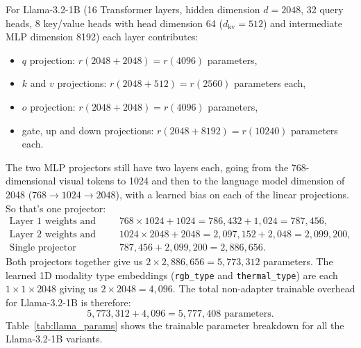\documentclass[12pt]{report}
\begin{document}
For Llama-3.2-1B (16 Transformer layers, hidden dimension $d=2048$, 32 query heads, 8 key/value heads with head dimension 64 ($d_{\text{kv}}=512$) and intermediate MLP dimension 8192) each layer contributes:
\begin{itemize}[leftmargin=0.5in, itemsep=1pt]
  \item $q$ projection: $r(2048 + 2048) = r(4096)$ parameters,
  \item $k$ and $v$ projections: $r(2048 + 512) = r(2560)$ parameters each,
  \item $o$ projection: $r(2048 + 2048) = r(4096)$ parameters,
  \item gate, up and down projections: $r(2048 + 8192) = r(10240)$ parameters each.
\end{itemize}
The two MLP projectors still have two layers each, going from the 768-dimensional visual tokens to 1024 and then to the language model dimension of 2048 ($768 \to 1024 \to 2048$), with a learned bias on each of the linear projections. So that's one projector:
\begin{align}
\text{Layer 1 weights and biases:} \quad & 768 \times 1024 + 1024 = 786{,}432 + 1{,}024 = 787{,}456, \\
\text{Layer 2 weights and biases:} \quad & 1024 \times 2048 + 2048 = 2{,}097{,}152 + 2{,}048 = 2{,}099{,}200, \\
\text{Single projector subtotal:} \quad & 787{,}456 + 2{,}099{,}200 = 2{,}886{,}656.
\end{align}
Both projectors together give us $2 \times 2{,}886{,}656 = 5{,}773{,}312$ parameters. The learned 1D modality type embeddings (\texttt{rgb\_type} and \texttt{thermal\_type}) are each $1 \times 1 \times 2048$ giving us $2 \times 2048 = 4{,}096$. The total non-adapter trainable overhead for Llama-3.2-1B is therefore:
\begin{equation}
5{,}773{,}312 + 4{,}096 = 5{,}777{,}408 \text{ parameters}.
\end{equation}
Table~\ref{tab:llama_params} shows the trainable parameter breakdown for all the Llama-3.2-1B variants.

\clearpage
\end{document}
